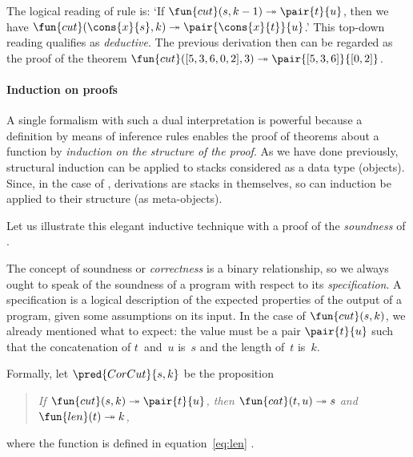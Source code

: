 The logical reading of rule  is: `If \(\fun{cut}(s,k-1)
\twoheadrightarrow \pair{t}{u}\), then we have
\(\fun{cut}(\cons{x}{s},k) \twoheadrightarrow
\pair{\cons{x}{t}}{u}\).'  This top\hyp{}down reading qualifies as
\emph{deductive}. The
previous derivation then can be regarded as the proof of the theorem
\(\fun{cut}([5,3,6,0,2],3) \twoheadrightarrow \pair{[5,3,6]}{[0,2]}\).


\paragraph{Induction on proofs}

A single formalism with such a dual interpretation is powerful because
a definition by means of inference rules enables the proof of theorems
about a function by \emph{induction on the structure of the proof}. As
we have done previously, structural induction can be applied to stacks
considered as a data type (objects). Since, in the case of
, derivations are stacks in themselves, so can induction be
applied to their structure (as meta\hyp{}objects).

Let us illustrate this elegant inductive technique with a proof of the
\emph{soundness} of
.

\label{par:cut_sound}

The concept of soundness or \emph{correctness} \citep{McCarthy_1962,
  Floyd_1967, Hoare_1971,
  Dijkstra_1976} is a binary
relationship, so we always ought to speak of the soundness of a
program with respect to its
\emph{specification}. A specification is a
logical description of the expected properties of the output of a
program, given some assumptions on its input. In the case of
\(\fun{cut}(s,k)\), we already mentioned what to expect: the value
must be a pair \(\pair{t}{u}\) such that the concatenation of
\(t\)~and~\(u\) is~\(s\) and the length of~\(t\) is~\(k\).

Formally, let \(\pred{CorCut}{s,k}\)
be the proposition
\begin{quote}
  \textsl{If \(\fun{cut}(s,k) \twoheadrightarrow \pair{t}{u}\), then
    \(\fun{cat}(t,u) \twoheadrightarrow s\) and \(\fun{len}(t)
    \twoheadrightarrow k\),}
\end{quote}
where the function  is defined in
equation~\eqref{eq:len} .

